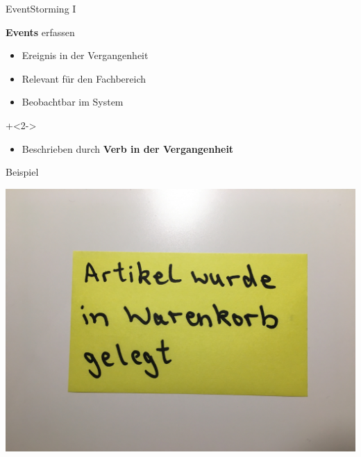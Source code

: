 
\begin{frame}[fragile]{EventStorming I}

\textbf{Events} erfassen

\begin{itemize}
\item Ereignis in der Vergangenheit
\item Relevant für den Fachbereich
\item Beobachtbar im System
\end{itemize}

\onslide+<2->
\begin{itemize}
\item Beschrieben durch \textbf{Verb in der Vergangenheit}
\end{itemize}

\end{frame}

\begin{frame}[fragile]{Beispiel}

\begin{center}
\includegraphics[width=.5\textwidth]{pics/eventstorming1.jpg}
\end{center}

\end{frame}


